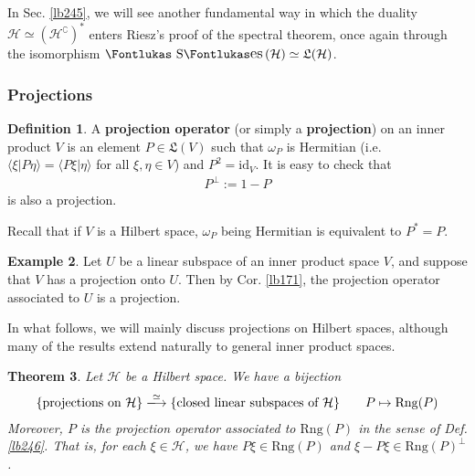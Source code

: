 \documentclass[12pt,b5paper,notitlepage]{article}
\theoremstyle{definition}
\newtheorem{df}{Definition}[subsection]
\newtheorem{eg}[df]{Example}
\theoremstyle{plain}
\newtheorem{thm}[df]{Theorem}
\DeclareMathOperator{\Ses}{\text{\Fontlukas S}\text{\kern -0pt {\Fontlukas\large es}}\,}
\newcommand{\fk}{\mathfrak}
\newcommand{\id}{\mathrm{id}}
\newcommand{\bk}[1]{\langle {#1}\rangle}
\newcommand{\Co}{\complement}
\newcommand{\Rng}{\mathrm{Rng}}
\newcommand{\MH}{\mathcal H}
\numberwithin{equation}{section}
\begin{document}
In Sec. \ref{lb245}, we will see another fundamental way in which the duality $\MH\simeq(\MH^\Co)^*$ enters Riesz's proof of the spectral theorem, once again through the isomorphism $\Ses(\MH)\simeq\fk L(\MH)$.


\subsubsection{Projections}





\begin{df}
A \textbf{projection operator} (or simply a \textbf{projection})  on an inner product $V$ is an element $P\in\fk L(V)$ such that $\omega_P$ is Hermitian (i.e. $\bk{\xi|P\eta}=\bk{P\xi|\eta}$ for all $\xi,\eta\in V$) and $P^2=\id_V$. It is easy to check that 
\begin{align*}
P^\perp:=1-P
\end{align*}
is also a projection.
\end{df}

Recall that if $V$ is a Hilbert space, $\omega_P$ being Hermitian is equivalent to $P^*=P$.


\begin{eg}
Let $U$ be a linear subspace of an inner product space $V$, and suppose that $V$ has a projection onto $U$. Then by Cor. \ref{lb171}, the projection operator associated to $U$ is a projection.
\end{eg}


In what follows, we will mainly discuss projections on Hilbert spaces, although many of the results extend naturally to general inner product spaces.



\begin{thm}\label{lb248}
Let $\MH$ be a Hilbert space. We have a bijection
\begin{gather}\label{eq139}
\{\text{projections on $\MH$}\}\xlongrightarrow{\simeq}\{\text{closed linear subspaces of $\MH$}\}\qquad P\mapsto \Rng(P)
\end{gather}
Moreover, $P$ is the projection operator associated to $\Rng(P)$ in the sense of Def. \ref{lb246}. That is, for each $\xi\in\MH$, we have $P\xi\in\Rng(P)$ and $\xi-P\xi\in\Rng(P)^\perp$.
\end{thm}
\end{document}
